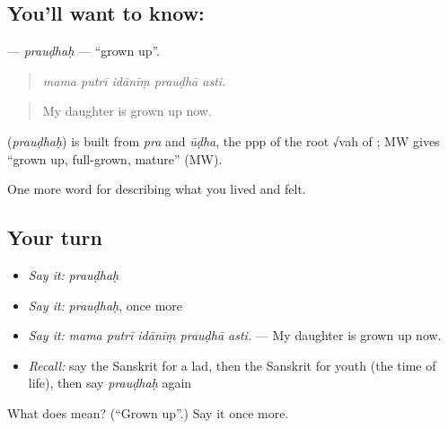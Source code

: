 \subsection*{You'll want to know: }
\textbf{} — \emph{prauḍhaḥ} — \textquotedblleft{}grown up\textquotedblright{}.

\begin{quote}
    
\end{quote}

\begin{quote}
\emph{mama putrī idānīṃ prauḍhā asti.}
\end{quote}

\begin{quote}
My daughter is grown up now.
\end{quote}

\begin{cousinweb}
\textbf{} (\emph{prauḍhaḥ}) is built from \emph{pra} and \emph{ūḍha}, the ppp of the root √vah of \textbf{}; MW gives \textquotedblleft{}grown up, full-grown, mature\textquotedblright{} (MW).
\end{cousinweb}

\begin{grammarlens}[title={What you've built}]
One more word for describing what you lived and felt.
\end{grammarlens}

\subsection*{Your turn}
\begin{itemize}
\raggedright
  \item \emph{Say it:} \emph{prauḍhaḥ}
  \item \emph{Say it:} \emph{prauḍhaḥ}, once more
  \item \emph{Say it:} \emph{mama putrī idānīṃ prauḍhā asti.} — My daughter is grown up now.
  \item \emph{Recall:} say the Sanskrit for a lad, then the Sanskrit for youth (the time of life), then say \emph{prauḍhaḥ} again
\end{itemize}

\begin{tcolorbox}[breakable,colback=teal!4,colframe=teal!35!black,title={Before you move on}]
What does  mean? (\textquotedblleft{}Grown up\textquotedblright{}.) Say it once more.
\end{tcolorbox}
